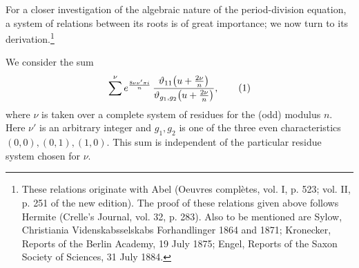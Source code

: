\documentclass[11pt]{article}
\begin{document}
For a closer investigation of the algebraic nature of the period-division equation, a system
of relations between its roots is of great importance; we now turn to its derivation.\footnote{
These relations originate with Abel (Oeuvres complètes, vol. I, p. 523; vol. II, p. 251 of
the new edition). The proof of these relations given above follows Hermite (Crelle's
Journal, vol. 32, p. 283). Also to be mentioned are Sylow, Christiania Videnskabsselskabs
Forhandlinger 1864 and 1871; Kronecker, Reports of the Berlin Academy, 19 July 1875;
Engel, Reports of the Saxon Society of Sciences, 31 July 1884.}

We consider the sum
\begin{equation}
\sum^{\nu} e^{\frac{8\nu\nu'\pi i}{n}}\,
{\vartheta_{11}\!\left(u+{2\nu\over n}\right)\over
 \vartheta_{g_1,g_2}\!\left(u+{2\nu\over n}\right)},
\tag{1}
\end{equation}
where $\nu$ is taken over a complete system of residues for the (odd) modulus $n$.
Here $\nu'$ is an arbitrary integer and $g_1,g_2$ is one of the three even characteristics
$(0,0),(0,1),(1,0)$. This sum is independent of the particular residue system chosen
for $\nu$.
\end{document}
